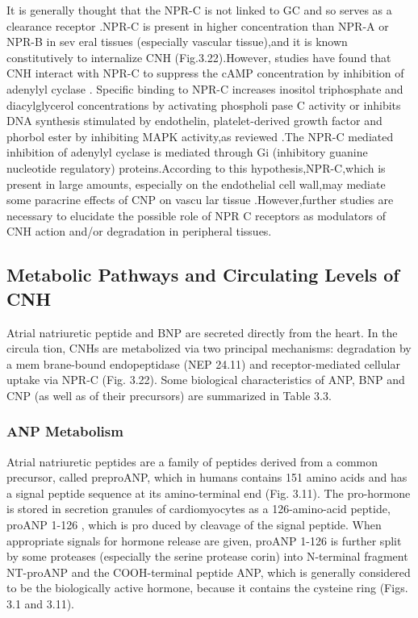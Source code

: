 \documentclass[14pt,a4paper,onecolumn]{extarticle}
\begin{document}
It is generally thought that the NPR-C is not linked to GC and so serves as a clearance receptor \citep{28} \citep{77} \citep{78}.NPR-C is present in higher concentration than NPR-A or NPR-B in sev eral tissues (especially vascular tissue),and it is known constitutively to internalize CNH \citep{172} (Fig.3.22).However, studies have found that CNH interact with NPR-C to suppress the cAMP concentration by inhibition of adenylyl cyclase \citep{190} \citep{191}. Specific binding to NPR-C increases inositol triphosphate and diacylglycerol concentrations by activating phospholi pase C activity or inhibits DNA synthesis stimulated by endothelin, platelet-derived growth factor and phorbol ester by inhibiting MAPK activity,as  reviewed \citep{190}.The NPR-C mediated inhibition of adenylyl cyclase is mediated through Gi (inhibitory guanine nucleotide regulatory) proteins.According to this hypothesis,NPR-C,which is present in large amounts, especially on the endothelial cell wall,may mediate some paracrine effects of CNP on vascu lar tissue \citep{168} \citep{190}.However,further studies are necessary to elucidate the possible role of NPR C receptors as modulators of CNH action and/or degradation in peripheral tissues.

\subsection{Metabolic Pathways and Circulating Levels of CNH}
Atrial natriuretic peptide and BNP are secreted directly from the heart. In the circula tion, CNHs are metabolized via two principal mechanisms: degradation by a mem brane-bound endopeptidase (NEP 24.11) and receptor-mediated cellular uptake via NPR-C \citep{14} (Fig. 3.22). Some biological characteristics of ANP, BNP and CNP (as well as of their precursors) are summarized in Table 3.3.

\subsubsection{ANP Metabolism}
Atrial natriuretic peptides are a family of peptides derived from a common precursor, called preproANP, which in humans contains 151 amino acids and has a signal peptide sequence at its amino-terminal end (Fig. 3.11). The pro-hormone is stored in secretion granules of cardiomyocytes as a 126-amino-acid peptide, proANP 1-126 , which is pro duced by cleavage of the signal peptide. When appropriate signals for hormone release are given, proANP 1-126 is further split by some proteases (especially the serine protease corin) \citep{192} into N-terminal fragment NT-proANP and the COOH-terminal peptide ANP, which is generally considered to be the biologically active hormone, because it contains the cysteine ring (Figs. 3.1 and 3.11).
\end{document}
